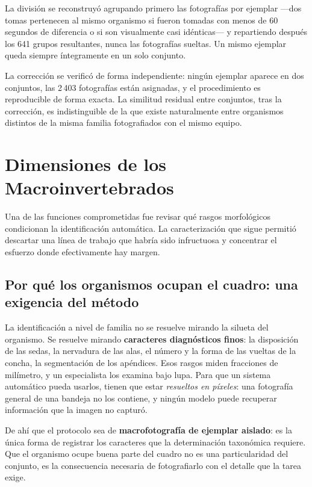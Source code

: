 \documentclass[onecolumn]{article}
\begin{document}
La división se reconstruyó agrupando primero las fotografías por ejemplar ---dos tomas pertenecen al mismo organismo si fueron tomadas con menos de 60 segundos de diferencia o si son visualmente casi idénticas--- y repartiendo después los 641 grupos resultantes, nunca las fotografías sueltas. Un mismo ejemplar queda siempre íntegramente en un solo conjunto.

La corrección se verificó de forma independiente: ningún ejemplar aparece en dos conjuntos, las 2\,403 fotografías están asignadas, y el procedimiento es reproducible de forma exacta. La similitud residual entre conjuntos, tras la corrección, es indistinguible de la que existe naturalmente entre organismos distintos de la misma familia fotografiados con el mismo equipo.

\section{Dimensiones de los Macroinvertebrados}

Una de las funciones comprometidas fue revisar qué rasgos morfológicos condicionan la identificación automática. La caracterización que sigue permitió descartar una línea de trabajo que habría sido infructuosa y concentrar el esfuerzo donde efectivamente hay margen.

\subsection{Por qué los organismos ocupan el cuadro: una exigencia del método}

La identificación a nivel de familia no se resuelve mirando la silueta del organismo. Se resuelve mirando \textbf{caracteres diagnósticos finos}: la disposición de las sedas, la nervadura de las alas, el número y la forma de las vueltas de la concha, la segmentación de los apéndices. Esos rasgos miden fracciones de milímetro, y un especialista los examina bajo lupa. Para que un sistema automático pueda usarlos, tienen que estar \emph{resueltos en píxeles}: una fotografía general de una bandeja no los contiene, y ningún modelo puede recuperar información que la imagen no capturó.

De ahí que el protocolo sea de \textbf{macrofotografía de ejemplar aislado}: es la única forma de registrar los caracteres que la determinación taxonómica requiere. Que el organismo ocupe buena parte del cuadro no es una particularidad del conjunto, es la consecuencia necesaria de fotografiarlo con el detalle que la tarea exige.
\end{document}
